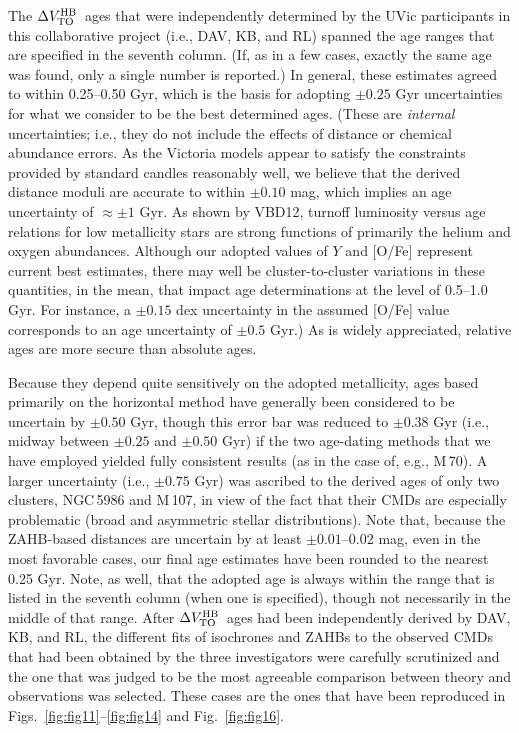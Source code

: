 \documentclass[12pt,preprint]{aastex}
\newcommand\delv{\Delta V^{\rm HB}_{\rm TO}}
\begin{document}
The $\delv$\ ages that were independently determined by the UVic participants
in this collaborative project (i.e., DAV, KB, and RL) spanned the age ranges
that are specified in the seventh column.  (If, as in a few cases, exactly the
same age was found, only a single number is reported.)  In general, these
estimates agreed to within 0.25--0.50 Gyr, which is the basis for adopting
$\pm 0.25$ Gyr uncertainties for what we consider to be the best determined
ages.  (These are {\it internal} uncertainties; i.e., they do not include the
effects of distance or chemical abundance errors.  As the Victoria models
appear to satisfy the constraints provided by standard candles reasonably well,
we believe that the derived distance moduli are accurate to within $\pm 0.10$
mag, which implies an age uncertainty of $\approx \pm 1$ Gyr.  As shown by
VBD12, turnoff luminosity versus age relations for low metallicity stars are
strong functions of primarily the helium and oxygen abundances.  Although our
adopted values of $Y$ and [O/Fe] represent current best estimates, there may
well be cluster-to-cluster variations in these quantities, in the mean, that
impact age determinations at the level of 0.5--1.0 Gyr.  For instance, a $\pm
0.15$ dex uncertainty in the assumed [O/Fe] value corresponds to an age
uncertainty of $\pm 0.5$ Gyr.)  As is widely appreciated, relative ages are
more secure than absolute ages.

Because they depend quite sensitively on the adopted metallicity, ages based
primarily on the horizontal method have generally been considered to be
uncertain by $\pm 0.50$ Gyr, though this error bar was reduced to $\pm 0.38$ Gyr
(i.e., midway between $\pm 0.25$ and $\pm 0.50$ Gyr) if the two age-dating
methods that we have employed yielded fully consistent results (as in the case
of, e.g., M$\,$70).  A larger uncertainty (i.e., $\pm 0.75$ Gyr) was
ascribed to the derived ages of only two clusters, NGC$\,$5986 and M$\,$107,
in view of the fact that their CMDs are especially problematic (broad and
asymmetric stellar distributions).  Note that, because the ZAHB-based distances
are uncertain by at least $\pm 0.01$--0.02 mag, even in the most favorable cases,
our final age estimates have been rounded to the nearest 0.25 Gyr.  Note, as
well, that the adopted age is always within the range that is listed in the
seventh column (when one is specified), though not necessarily in the middle of
that range.  After $\delv$\ ages had been independently derived by DAV, KB, and
RL, the different fits of isochrones and ZAHBs to the observed CMDs that had
been obtained by the three investigators were carefully scrutinized and the one
that was judged to be the most agreeable comparison between theory and
observations was selected.  These cases are the ones that have been reproduced
in Figs.~\ref{fig:fig11}--\ref{fig:fig14} and Fig.~\ref{fig:fig16}. 
\end{document}
